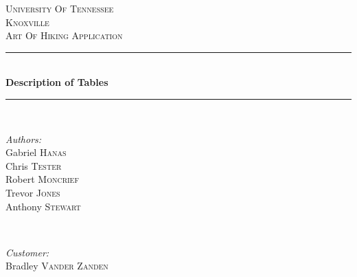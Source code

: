 \begin{titlepage}

\newcommand{\HRule}{\rule{\linewidth}{0.5mm}} %

\center %
 

\textsc{\LARGE University Of Tennessee\\ Knoxville}\\[1.5cm] %
\textsc{\Large Art Of Hiking Application}\\[0.5cm] %


\HRule \\[0.4cm]
{ \huge \bfseries Description of Tables}\\[0.4cm] %
\HRule \\[1.5cm]
 

\begin{minipage}{0.4\textwidth}
\begin{flushleft} \large
\emph{Authors:}\\
Gabriel \textsc{Hanas}\\
Chris \textsc{Tester}\\
Robert \textsc{Moncrief}\\
Trevor \textsc{Jones}\\
Anthony \textsc{Stewart}\\
\end{flushleft}
\end{minipage}
~
\begin{minipage}{0.4\textwidth}
\begin{flushright} \large
\emph{Customer:} \\
Bradley \textsc{Vander Zanden} %
\end{flushright}
\end{minipage}\\[4cm]


\end{titlepage}

